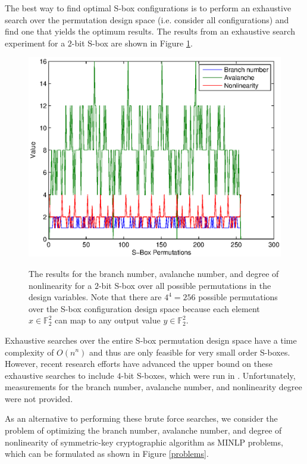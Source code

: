 \documentclass[11pt]{article}
\newcommand{\field}[1]{\mathbb{#1}} %
\begin{document}
The best way to find optimal S-box configurations is to perform an exhaustive search over the permutation design space (i.e. consider all configurations) and find one that yields the optimum results. The results from an exhaustive search experiment for a $2$-bit S-box are shown in Figure \ref{bfjoint}.
\begin{figure}
	\centering
	\includegraphics[scale=0.65]{images/brute_joint.eps} \\
	\label{bfjoint}
	\caption{The results for the branch number, avalanche number, and degree of nonlinearity for a $2$-bit S-box over all possible permutations in the design variables. Note that there are $4^4 = 256$ possible permutations over the S-box configuration design space because each element $x \in \field{F}_2^2$ can map to any output value $y \in \field{F}_2^2$.}
\end{figure}
Exhaustive searches over the entire S-box permutation design space have a time complexity of $O(n^n)$ and thus are only feasible for very small order S-boxes. However, recent research efforts have advanced the upper bound on these exhaustive searches to include $4$-bit S-boxes, which were run in \cite{Sbox4x4}. Unfortunately, measurements for the branch number, avalanche number, and nonlinearity degree were not provided. 

As an alternative to performing these brute force searches, we consider the problem of optimizing the branch number, avalanche number, and degree of nonlinearity of symmetric-key cryptographic algorithm as MINLP problems, which can be formulated as shown in Figure \ref{problems}.
\end{document}
